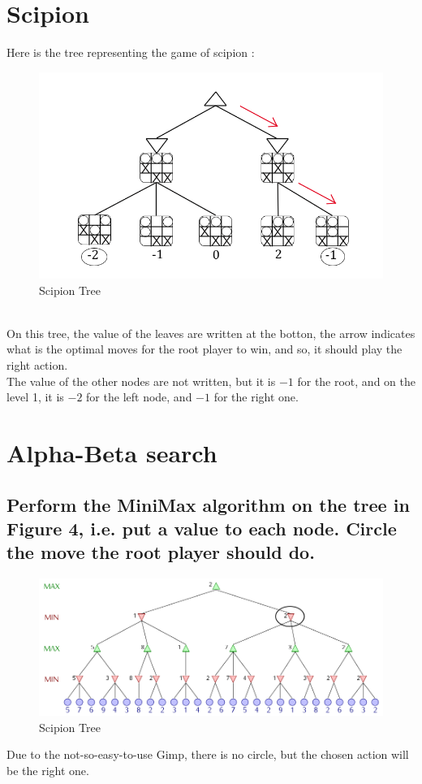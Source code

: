 \documentclass[a4paper,10pt]{article}
\begin{document}
	\newpage
	

	\section{Scipion}
		Here is the tree representing the game of scipion :
		\begin{figure}[h!]
			\centering
				\includegraphics[scale=2]{minmax_tree_scipion.png}
			\caption{Scipion Tree}
			\label{fig:server_connection}	
		\end{figure}\\
		On this tree, the value of the leaves are written at the botton, the arrow indicates what is the optimal moves for the root player to win, and so, it should play the right action.\\
		The value of the other nodes are not written, but it is $-1$ for the root, and on the level 1, it is $-2$ for the left node, and $-1$ for the right one.
	\section{Alpha-Beta search}	
		\subsection{Perform the MiniMax algorithm on the tree in Figure 4, i.e. put a value to each node. Circle the move the root player should do.}
		\begin{figure}[h!]
			\centering
				\includegraphics[scale=0.4]{arbre_minimax.png}
			\caption{Scipion Tree}
			\label{fig:server_connection}	
		\end{figure}
		Due to the not-so-easy-to-use Gimp, there is no circle, but the chosen action will be the right one.
\end{document}
